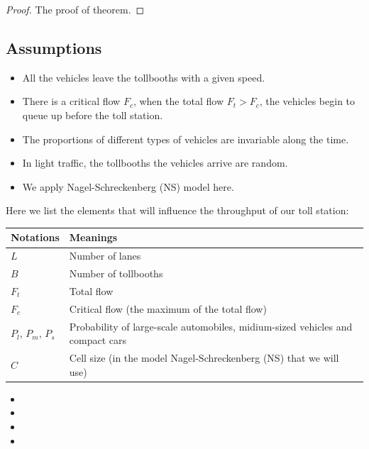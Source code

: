 \documentclass{mcmthesis}
\begin{document}
\begin{proof}
The proof of theorem.
\end{proof}

\subsection{Assumptions}

\begin{itemize}
	\item All the vehicles leave the tollbooths with a given speed.
	\item There is a critical flow $F_c$, when the total flow  $F_t>F_c$, the vehicles begin to queue up before the toll station.
	\item The proportions of different types of vehicles are invariable along the time.
	\item In light traffic, the tollbooths the vehicles arrive are random.
	\item We apply Nagel-Schreckenberg (NS) model here.
\end{itemize}



Here we list the elements that will influence the throughput of our toll station:

\begin{tabular}{|m{7cm}<{\centering}|p{7cm}<{\centering}|}
	\hline
	Notations & Meanings \\
	\hline
	 $L$ &  Number of lanes \\
	\hline
	 $B$ &  Number of tollbooths\\
	 \hline
     $F_t$ & 	 Total flow\\
     \hline
     $F_c$ & Critical flow (the maximum of the total flow)\\
     \hline
     $P_l$,  $P_m$, $P_s$ & Probability of large-scale automobiles, midium-sized vehicles and compact cars\\
     \hline
    $C$ & Cell size (in the model Nagel-Schreckenberg (NS) that we will use)\\
    \hline
     
\end{tabular}

\begin{itemize}
\item
\item
\item
\item
\end{itemize}
\end{document}
